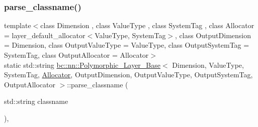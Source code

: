 \mbox{\label{structbc_1_1nn_1_1Polymorphic__Layer__Base_ac44549f47e2cac1e9b8e16a2ed2a7d41}} 
\subsubsection{\texorpdfstring{parse\+\_\+classname()}{parse\_classname()}\hspace{0.1cm}{\footnotesize\ttfamily [2/2]}}
{\footnotesize\ttfamily template$<$class Dimension , class Value\+Type , class System\+Tag , class Allocator  = layer\+\_\+default\+\_\+allocator$<$\+Value\+Type, System\+Tag$>$, class Output\+Dimension  = Dimension, class Output\+Value\+Type  = Value\+Type, class Output\+System\+Tag  = System\+Tag, class Output\+Allocator  = Allocator$>$ \\
static std\+::string \hyperlink{structbc_1_1nn_1_1Polymorphic__Layer__Base}{bc\+::nn\+::\+Polymorphic\+\_\+\+Layer\+\_\+\+Base}$<$ Dimension, Value\+Type, System\+Tag, \hyperlink{classbc_1_1allocators_1_1Allocator}{Allocator}, Output\+Dimension, Output\+Value\+Type, Output\+System\+Tag, Output\+Allocator $>$\+::parse\+\_\+classname (\begin{DoxyParamCaption}\item[{std\+::string}]{classname }\end{DoxyParamCaption})\hspace{0.3cm}{\ttfamily [inline]}, {\ttfamily [static]}}

\mbox{\label{structbc_1_1nn_1_1Polymorphic__Layer__Base_aaecf0bed7f2e610b7b923dbc3d4a81d6}} 
